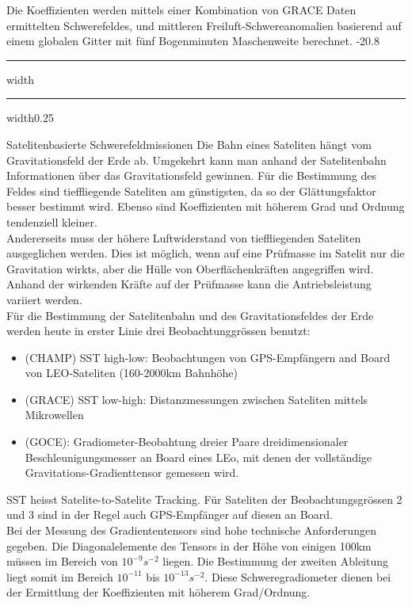 \documentclass[9pt, landscape, fleqn]{scrartcl}
\makeatletter
\renewcommand{\subsection}{\@startsection{subsection}{1}{0mm}%
{-2\baselineskip}{0.8\baselineskip}%
{\hrule depth 0.2pt width\columnwidth\hrule depth0.75pt
width0.25\columnwidth\vspace*{1.2em}\large\bfseries\rmfamily}}
\makeatother
\begin{document}
\begin{multicols*}{3}
Die Koeffizienten werden mittels einer Kombination von GRACE Daten ermittelten Schwerefeldes, und mittleren Freiluft-Schwereanomalien basierend auf einem globalen Gitter mit fünf Bogenminuten Maschenweite berechnet.
\subsection{Satelitenbasierte Schwerefeldmissionen}
Die Bahn eines Sateliten hängt vom Gravitationsfeld der Erde ab. Umgekehrt kann man anhand der Satelitenbahn Informationen über das Gravitationsfeld gewinnen. Für die Bestimmung des Feldes sind tieffliegende Sateliten am günstigsten, da so der Glättungsfaktor besser bestimmt wird. Ebenso sind Koeffizienten mit höherem Grad und Ordnung tendenziell kleiner. \\

Andererseits muss der höhere Luftwiderstand von tieffliegenden Sateliten ausgeglichen werden. Dies ist möglich, wenn auf eine Prüfmasse im Satelit nur die Gravitation wirkts, aber die Hülle von Oberflächenkräften angegriffen wird. Anhand der wirkenden Kräfte auf der Prüfmasse kann die Antriebsleistung variiert werden. \\

Für die Bestimmung der Satelitenbahn und des Gravitationsfeldes der Erde werden heute in erster Linie drei Beobachtunggrössen benutzt:
\begin{itemize}
    \item (CHAMP) SST high-low: Beobachtungen von GPS-Empfängern and Board von LEO-Sateliten (160-2000km Bahnhöhe)
    \item (GRACE) SST low-high: Distanzmessungen zwischen Sateliten mittels Mikrowellen
    \item (GOCE): Gradiometer-Beobahtung dreier Paare dreidimensionaler Beschleunigungsmesser an Board eines LEo, mit denen der vollständige Gravitations-Gradienttensor gemessen wird.
\end{itemize}
SST heisst Satelite-to-Satelite Tracking. Für Sateliten der Beobachtungsgrössen 2 und 3 sind in der Regel auch GPS-Empfänger auf diesen an Board. \\

Bei der Messung des Gradiententensors sind hohe technische Anforderungen gegeben. Die Diagonalelemente des Tensors in der Höhe von einigen 100km müssen im Bereich von $10^{-9} s^{-2}$ liegen. Die Bestimmung der zweiten Ableitung liegt somit im Bereich $10^{-11}$ bis $10^{-13} s^{-2}$. Diese Schweregradiometer dienen bei der Ermittlung der Koeffizienten mit höherem Grad/Ordnung. \\


\end{multicols*}
\end{document}
